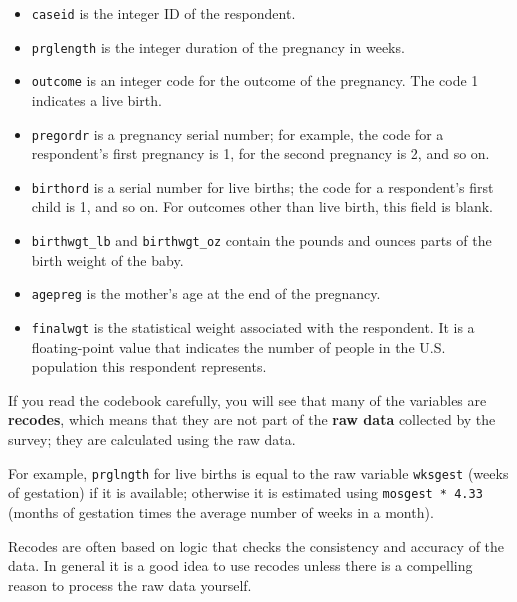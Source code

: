 \documentclass[12pt]{book}
\begin{document}
\begin{itemize}

\item {\tt caseid} is the integer ID of the respondent.

\item {\tt prglength} is the integer duration of the pregnancy in weeks.

\item {\tt outcome} is an integer code for the outcome of the
  pregnancy.  The code 1 indicates a live birth.

\item {\tt pregordr} is a pregnancy serial number; for example, the
  code for a respondent's first pregnancy is 1, for the second
  pregnancy is 2, and so on.

\item {\tt birthord} is a serial number for live
  births; the code for a respondent's first child is 1, and so on.
  For outcomes other than live birth, this field is blank.

\item \verb"birthwgt_lb" and \verb"birthwgt_oz" contain the pounds and
  ounces parts of the birth weight of the baby.

\item {\tt agepreg} is the mother's age at the end of the pregnancy.

\item {\tt finalwgt} is the statistical weight associated with the
  respondent.  It is a floating-point value that indicates the number
  of people in the U.S. population this respondent represents.

\end{itemize}

If you read the codebook carefully, you will see that many of the
variables are {\bf recodes}, which means that they are not part of the
{\bf raw data} collected by the survey; they are calculated using
the raw data.   

For example, {\tt prglngth} for live births is equal to the raw
variable {\tt wksgest} (weeks of gestation) if it is available;
otherwise it is estimated using {\tt mosgest * 4.33} (months of
gestation times the average number of weeks in a month).

Recodes are often based on logic that checks the consistency and
accuracy of the data.  In general it is a good idea to use recodes
unless there is a compelling reason to process the raw data
yourself.
\end{document}
